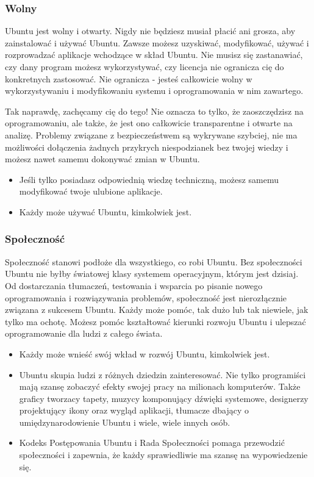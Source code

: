 \subsubsection{Wolny}
Ubuntu jest wolny i otwarty. Nigdy nie będziesz musiał płacić ani grosza, aby zainstalować i używać Ubuntu. Zawsze możesz uzyskiwać, modyfikować, używać i rozprowadzać aplikacje wchodzące w skład Ubuntu. Nie musisz się zastanawiać, czy dany program możesz wykorzystywać, czy licencja nie ogranicza cię do konkretnych zastosować. Nie ogranicza - jesteś całkowicie wolny w wykorzystywaniu i modyfikowaniu systemu i oprogramowania w nim zawartego.

Tak naprawdę, zachęcamy cię do tego! Nie oznacza to tylko, że zaoszczędzisz na oprogramowaniu, ale także, że jest ono całkowicie transparentne i otwarte na analizę. Problemy związane z bezpieczeństwem są wykrywane szybciej, nie ma możliwości dołączenia żadnych przykrych niespodzianek bez twojej wiedzy i możesz nawet samemu dokonywać zmian w Ubuntu.
\begin{itemize}
\item Jeśli tylko posiadasz odpowiednią wiedzę techniczną, możesz samemu modyfikować twoje ulubione aplikacje.
\item Każdy może używać Ubuntu, kimkolwiek jest.
\end{itemize}
\subsubsection{Społeczność}
Społeczność stanowi podłoże dla wszystkiego, co robi Ubuntu. Bez społeczności Ubuntu nie byłby światowej klasy systemem operacyjnym, którym jest dzisiaj. Od dostarczania tłumaczeń, testowania i wsparcia po pisanie nowego oprogramowania i rozwiązywania problemów, społeczność jest nierozłącznie związana z sukcesem Ubuntu. Każdy może pomóc, tak dużo lub tak niewiele, jak tylko ma ochotę. Możesz pomóc kształtować kierunki rozwoju Ubuntu i ulepszać oprogramowanie dla ludzi z całego świata.
\begin{itemize}
\item Każdy może wnieść swój wkład w rozwój Ubuntu, kimkolwiek jest.
\item Ubuntu skupia ludzi z różnych dziedzin zainteresować. Nie tylko programiści mają szansę zobaczyć efekty swojej pracy na milionach komputerów. Także graficy tworzacy tapety, muzycy komponujący dźwięki systemowe, designerzy projektujący ikony oraz wygląd aplikacji, tłumacze dbający o umiędzynarodowienie Ubuntu i wiele, wiele innych osób.
\item Kodeks Postępowania Ubuntu i Rada Społeczności pomaga przewodzić społeczności i zapewnia, że każdy sprawiedliwie ma szansę na wypowiedzenie się.
\end{itemize}
\clearpage



